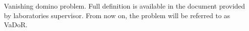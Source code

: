 Vanishing domino problem. Full definition is available in the document provided by laboratories
supervisor. From now on, the problem will be referred to as VaDoR.
